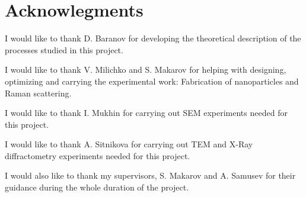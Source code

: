 \section*{Acknowlegments}

        I would like to thank D. Baranov for developing the theoretical description of the processes studied in this project.

        I would like to thank V. Milichko and S. Makarov for helping with designing, optimizing and carrying the experimental work:
    Fabrication of nanoparticles and Raman scattering.

        I would like to thank I. Mukhin for carrying out SEM experiments needed for this project.

        I would like to thank A. Sitnikova for carrying out TEM and X-Ray diffractometry experiments needed for this project.

        I would also like to thank my supervisors, S. Makarov and A. Samusev for their guidance during the whole duration of the project.


\pagebreak
